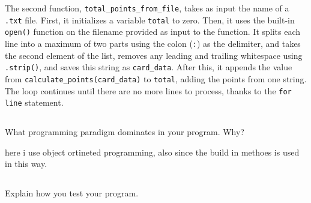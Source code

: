 \documentclass{article}
\begin{document}
The second function, \texttt{total\_points\_from\_file}, takes as input the name of a \texttt{.txt} file. First, it initializes a variable \texttt{total} to zero. Then, it uses the built-in \texttt{open()} function on the filename provided as input to the function. It splits each line into a maximum of two parts using the colon (\texttt{:}) as the delimiter, and takes the second element of the list, removes any leading and trailing whitespace using \texttt{.strip()}, and saves this string as \texttt{card\_data}. After this, it appends the value from \texttt{calculate\_points(card\_data)} to \texttt{total}, adding the points from one string. The loop continues until there are no more lines to process, thanks to the \texttt{for line} statement.



\subsection{}

What programming paradigm dominates in your program. Why?

here i use object ortineted programming, also since the build in methoes is used in this way.


\subsection{}


Explain how you test your program.


\section{}




\subsection{}
\end{document}
